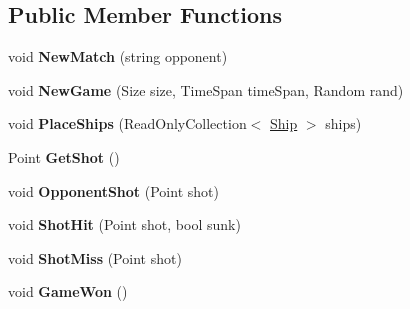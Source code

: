 \subsection*{Public Member Functions}
\begin{DoxyCompactItemize}
\item 
\hypertarget{interface_m_b_c_core_1_1_i_battleship_controller_a4daa97c570456c0f658b29c8604fb997}{void {\bfseries New\-Match} (string opponent)}\label{interface_m_b_c_core_1_1_i_battleship_controller_a4daa97c570456c0f658b29c8604fb997}

\item 
\hypertarget{interface_m_b_c_core_1_1_i_battleship_controller_a3fb024ee0c5a1d6c41c2200fb304fc98}{void {\bfseries New\-Game} (Size size, Time\-Span time\-Span, Random rand)}\label{interface_m_b_c_core_1_1_i_battleship_controller_a3fb024ee0c5a1d6c41c2200fb304fc98}

\item 
\hypertarget{interface_m_b_c_core_1_1_i_battleship_controller_ac4ddb7452087991b4eea6c427a3bea63}{void {\bfseries Place\-Ships} (Read\-Only\-Collection$<$ \hyperlink{class_m_b_c_core_1_1_ship}{Ship} $>$ ships)}\label{interface_m_b_c_core_1_1_i_battleship_controller_ac4ddb7452087991b4eea6c427a3bea63}

\item 
\hypertarget{interface_m_b_c_core_1_1_i_battleship_controller_a1e3c87e16bce6a434c268f2c3611ca26}{Point {\bfseries Get\-Shot} ()}\label{interface_m_b_c_core_1_1_i_battleship_controller_a1e3c87e16bce6a434c268f2c3611ca26}

\item 
\hypertarget{interface_m_b_c_core_1_1_i_battleship_controller_a8470d0eaefee634cfd39bda4e94d9663}{void {\bfseries Opponent\-Shot} (Point shot)}\label{interface_m_b_c_core_1_1_i_battleship_controller_a8470d0eaefee634cfd39bda4e94d9663}

\item 
\hypertarget{interface_m_b_c_core_1_1_i_battleship_controller_a759d1cf6f3ca3c78fe9940cf67e19cee}{void {\bfseries Shot\-Hit} (Point shot, bool sunk)}\label{interface_m_b_c_core_1_1_i_battleship_controller_a759d1cf6f3ca3c78fe9940cf67e19cee}

\item 
\hypertarget{interface_m_b_c_core_1_1_i_battleship_controller_a3d405e2bcf639c88de5e532046d529bf}{void {\bfseries Shot\-Miss} (Point shot)}\label{interface_m_b_c_core_1_1_i_battleship_controller_a3d405e2bcf639c88de5e532046d529bf}

\item 
\hypertarget{interface_m_b_c_core_1_1_i_battleship_controller_a6d81949400bc511fb91faf7b43c87718}{void {\bfseries Game\-Won} ()}\label{interface_m_b_c_core_1_1_i_battleship_controller_a6d81949400bc511fb91faf7b43c87718}


\end{DoxyCompactItemize}
